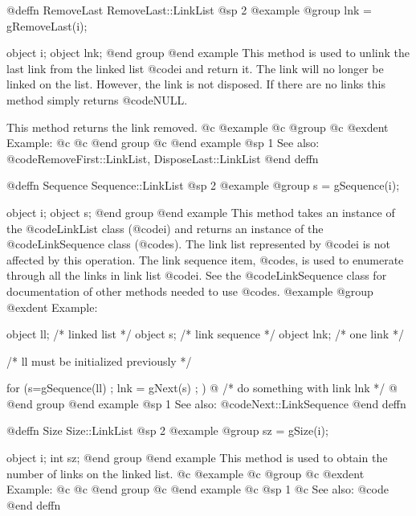 @deffn {RemoveLast} RemoveLast::LinkList
@sp 2
@example
@group
lnk = gRemoveLast(i);

object  i;
object  lnk;
@end group
@end example
This method is used to unlink the last link from the linked list
@code{i} and return it.  The link will no longer be linked on the list.
However, the link is not disposed.  If there are no links this method
simply returns @code{NULL}.

This method returns the link removed.
@c @example
@c @group
@c @exdent Example:
@c 
@c @end group
@c @end example
@sp 1
See also:  @code{RemoveFirst::LinkList, DisposeLast::LinkList}
@end deffn










@deffn {Sequence} Sequence::LinkList
@sp 2
@example
@group
s = gSequence(i);

object  i;
object  s;
@end group
@end example
This method takes an instance of the @code{LinkList} class (@code{i})
and returns an instance of the @code{LinkSequence} class (@code{s}).
The link list represented by @code{i} is not affected by this operation.
The link sequence item, @code{s}, is used to enumerate through all the
links in link list @code{i}.  See the @code{LinkSequence} class for
documentation of other methods needed to use @code{s}.
@example
@group
@exdent Example:

object  ll;  /*  linked list    */
object  s;   /*  link sequence  */
object  lnk; /*  one link       */

/*  ll must be initialized previously  */

for (s=gSequence(ll) ; lnk = gNext(s) ; )  @{
        /*  do something with link lnk  */
@}
@end group
@end example
@sp 1
See also:  @code{Next::LinkSequence}
@end deffn

















@deffn {Size} Size::LinkList
@sp 2
@example
@group
sz = gSize(i);

object  i;
int     sz;
@end group
@end example
This method is used to obtain the number of links on the linked list.
@c @example
@c @group
@c @exdent Example:
@c 
@c @end group
@c @end example
@c @sp 1
@c See also:  @code{}
@end deffn












